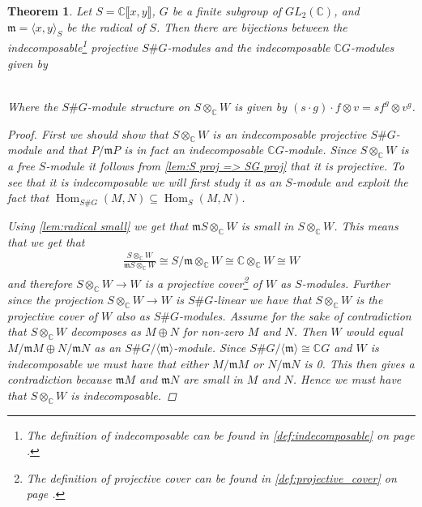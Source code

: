 \documentclass[11pt, a4paper, english]{article}
\newtheorem{theorem}{Theorem}[section]
\theoremstyle{definition}
\newcommand{\C}{\mathbb{C}}
\DeclareMathOperator{\Hom}{Hom}
\begin{document}
\begin{theorem}
\label{thm:indec_proj_SG=indec_CG}
Let $S = \C\llbracket x, y \rrbracket$, $G$ be a finite subgroup of $GL_2(\C)$, and $\mathfrak{m} = \langle x, y \rangle_S$ be the radical of $S$. Then there are bijections between the indecomposable\footnote{The definition of indecomposable can be found in \cref{def:indecomposable} on page \pageref{def:indecomposable}.} projective $S\#G$-modules and the indecomposable $\C G$-modules given by
\\
\\

Where the $S\#G$-module structure on $S \otimes_\C W$ is given by $(s \cdot g) \cdot f \otimes v = sf^g \otimes v^g$.

\begin{proof}
First we should show that $S \otimes_\C W$ is an indecomposable projective $S\#G$-module and that $P/\mathfrak{m}P$ is in fact an indecomposable $\C G$-module. Since $S \otimes_\C W$ is a free $S$-module it follows from \cref{lem:S proj => SG proj} that it is projective. To see that it is indecomposable we will first study it as an $S$-module and exploit the fact that $\Hom_{S\#G}(M,N) \subseteq \Hom_S(M,N)$. 

Using \cref{lem:radical small} we get that $\mathfrak{m}S \otimes_\C W$ is small in $S\otimes_\C W$. This means that we get that 
\begin{align*}
\frac{S \otimes_\C W}{\mathfrak{m}S \otimes_\C W} \cong S/\mathfrak{m} \otimes_\C W \cong \C \otimes_\C W \cong W
\end{align*}
and therefore $S \otimes_\C W \to W$ is a projective cover\footnote{The definition of projective cover can be found in \cref{def:projective_cover} on page \pageref{def:projective_cover}.} of $W$ as $S$-modules. Further since the projection $S \otimes_\C W \to W$ is $S\#G$-linear we have that $S \otimes_\C W$ is the projective cover of $W$ also as $S\#G$-modules. Assume for the sake of contradiction that $S \otimes_\C W$ decomposes as $M \oplus N$ for non-zero $M$ and $N$. Then $W$ would equal $M/\mathfrak{m}M \oplus N/\mathfrak{m}N$ as an $S\#G/ \langle \mathfrak{m} \rangle$-module. Since $S\#G/ \langle \mathfrak{m} \rangle \cong \C G$ and $W$ is indecomposable we must have that either $M/\mathfrak{m}M$ or $N/\mathfrak{m}N$ is 0. This then gives a contradiction because $\mathfrak{m}M$ and $\mathfrak{m}N$ are small in $M$ and $N$. Hence we must have that $S \otimes_\C W$ is indecomposable.


\end{proof}
\end{theorem}
\end{document}
